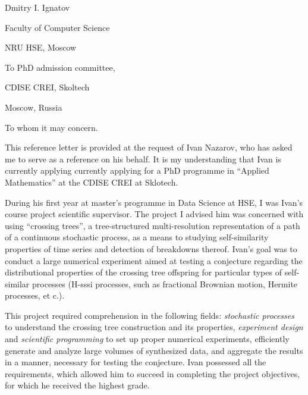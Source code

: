 \documentclass[14pt]{extarticle}
\begin{document}
\hspace*{0.55\linewidth}
\begin{minipage}{0.45\linewidth}
Dmitry I. Ignatov \par
Faculty of Computer Science \par
NRU HSE, Moscow
\end{minipage}\par \bigskip

\begin{minipage}{0.5\linewidth}
To PhD admission committee, \par
CDISE CREI, Skoltech \par
Moscow, Russia \par
\end{minipage} \par\bigskip

To whom it may concern. \par\bigskip

This reference letter is provided at the request of Ivan Nazarov, who has asked me
to serve as a reference on his behalf. It is my understanding that Ivan is currently
applying currently applying for a PhD programme in ``Applied Mathematics'' at the
CDISE CREI at Sklotech. \par\medskip

During his first year at master's programme in Data Science at HSE, I was Ivan's
course project scientific supervisor. The project I advised him was concerned with
using ``crossing trees'', a tree-structured multi-resolution representation of a
path of a continuous stochastic process, as a means to studying self-similarity
properties of time series and detection of breakdowns thereof. Ivan's goal was to
conduct a large numerical experiment aimed at testing a conjecture regarding the
distributional properties of the crossing tree offspring for particular types of
self-similar processes (H-sssi processes, such as fractional Brownian motion,
Hermite processes, et c.). \par\medskip

This project required comprehension in the following fields: \textit{stochastic processes}
to understand the crossing tree construction and its properties, \textit{experiment
design} and \textit{scientific programming} to set up proper numerical experiments,
efficiently generate and analyze large volumes of synthesized data, and aggregate
the results in a manner, necessary for testing the conjecture. Ivan possessed all
the requirements, which allowed him to succeed in completing the project objectives,
for which he received the highest grade. \par\medskip
\end{document}
